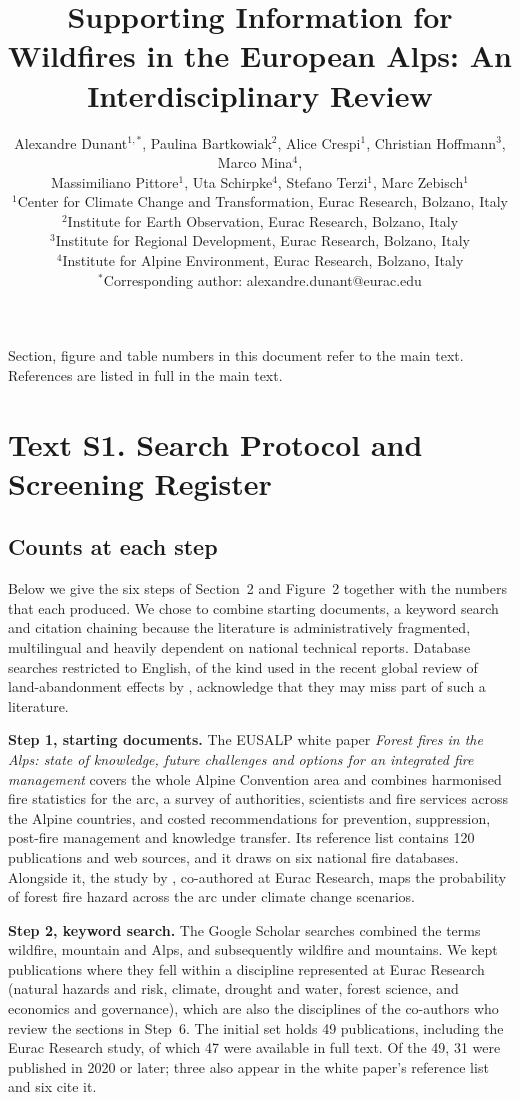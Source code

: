 \documentclass[11pt,a4paper]{article}
\title{Supporting Information for\\
Wildfires in the European Alps: An Interdisciplinary Review}
\author{
Alexandre Dunant$^{1,*}$, Paulina Bartkowiak$^{2}$, Alice Crespi$^{1}$, Christian Hoffmann$^{3}$, Marco Mina$^{4}$,\\
Massimiliano Pittore$^{1}$, Uta Schirpke$^{4}$, Stefano Terzi$^{1}$, Marc Zebisch$^{1}$ \\[2mm]
\small $^{1}$Center for Climate Change and Transformation, Eurac Research, Bolzano, Italy \\
\small $^{2}$Institute for Earth Observation, Eurac Research, Bolzano, Italy \\
\small $^{3}$Institute for Regional Development, Eurac Research, Bolzano, Italy \\
\small $^{4}$Institute for Alpine Environment, Eurac Research, Bolzano, Italy \\[1mm]
\small $^{*}$Corresponding author: alexandre.dunant@eurac.edu
}
\date{}
\begin{document}
\maketitle

\noindent Section, figure and table numbers in this document refer to the main text. References are listed in full in the main text.


\section*{Text S1. Search Protocol and Screening Register}
\label{app:protocol}

\subsection*{Counts at each step}

Below we give the six steps of Section~2 and Figure~2 together with the numbers that each produced. We chose to combine starting documents, a keyword search and citation chaining because the literature is administratively fragmented, multilingual and heavily dependent on national technical reports. Database searches restricted to English, of the kind used in the recent global review of land-abandonment effects by \citet{mantero_influence_2020}, acknowledge that they may miss part of such a literature.

\textbf{Step 1, starting documents.} The EUSALP white paper \emph{Forest fires in the Alps: state of knowledge, future challenges and options for an integrated fire management} \citep{muller_forest_2020} covers the whole Alpine Convention area and combines harmonised fire statistics for the arc, a survey of authorities, scientists and fire services across the Alpine countries, and costed recommendations for prevention, suppression, post-fire management and knowledge transfer. Its reference list contains 120 publications and web sources, and it draws on six national fire databases. Alongside it, the study by \citet{gerberding_mapping_2025}, co-authored at Eurac Research, maps the probability of forest fire hazard across the arc under climate change scenarios.

\textbf{Step 2, keyword search.} The Google Scholar searches combined the terms wildfire, mountain and Alps, and subsequently wildfire and mountains. We kept publications where they fell within a discipline represented at Eurac Research (natural hazards and risk, climate, drought and water, forest science, and economics and governance), which are also the disciplines of the co-authors who review the sections in Step~6. The initial set holds 49 publications, including the Eurac Research study, of which 47 were available in full text. Of the 49, 31 were published in 2020 or later; three also appear in the white paper's reference list and six cite it.
\end{document}
